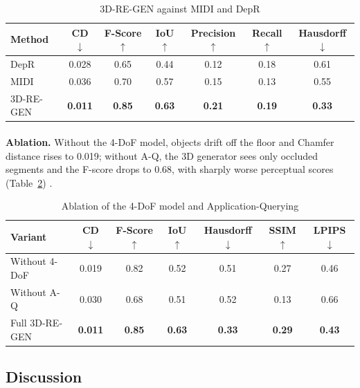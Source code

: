 \documentclass[12pt,a4paper,final]{extreport}
\begin{document}
{\renewcommand{\arraystretch}{1.12}
\begin{table}[htbp]
\centering
\caption{3D-RE-GEN against MIDI and DepR}\label{tab:p1_main}
\small
\begin{tabular}{|l|c|c|c|c|c|c|}
\hline
\textbf{Method} & \textbf{CD $\downarrow$} & \textbf{F-Score $\uparrow$} & \textbf{IoU $\uparrow$} & \textbf{Precision $\uparrow$} & \textbf{Recall $\uparrow$} & \textbf{Hausdorff $\downarrow$} \\ \hline
DepR & 0.028 & 0.65 & 0.44 & 0.12 & 0.18 & 0.61 \\ \hline
MIDI & 0.036 & 0.70 & 0.57 & 0.15 & 0.13 & 0.55 \\ \hline
3D-RE-GEN & \textbf{0.011} & \textbf{0.85} & \textbf{0.63} & \textbf{0.21} & \textbf{0.19} & \textbf{0.33} \\ \hline
\end{tabular}
\end{table}}

\paragraph{} \textbf{Ablation.} Without the 4-DoF model, objects drift off the floor and Chamfer distance rises to 0.019; without A-Q, the 3D generator sees only occluded segments and the F-score drops to 0.68, with sharply worse perceptual scores (Table~\ref{tab:p1_ablation}) \cite{p1}.

{\renewcommand{\arraystretch}{1.12}
\begin{table}[htbp]
\centering
\caption{Ablation of the 4-DoF model and Application-Querying}\label{tab:p1_ablation}
\small
\begin{tabular}{|l|c|c|c|c|c|c|}
\hline
\textbf{Variant} & \textbf{CD $\downarrow$} & \textbf{F-Score $\uparrow$} & \textbf{IoU $\uparrow$} & \textbf{Hausdorff $\downarrow$} & \textbf{SSIM $\uparrow$} & \textbf{LPIPS $\downarrow$} \\ \hline
Without 4-DoF & 0.019 & 0.82 & 0.52 & 0.51 & 0.27 & 0.46 \\ \hline
Without A-Q & 0.030 & 0.68 & 0.51 & 0.52 & 0.13 & 0.66 \\ \hline
Full 3D-RE-GEN & \textbf{0.011} & \textbf{0.85} & \textbf{0.63} & \textbf{0.33} & \textbf{0.29} & \textbf{0.43} \\ \hline
\end{tabular}
\end{table}}

\subsection{Discussion}
\end{document}
